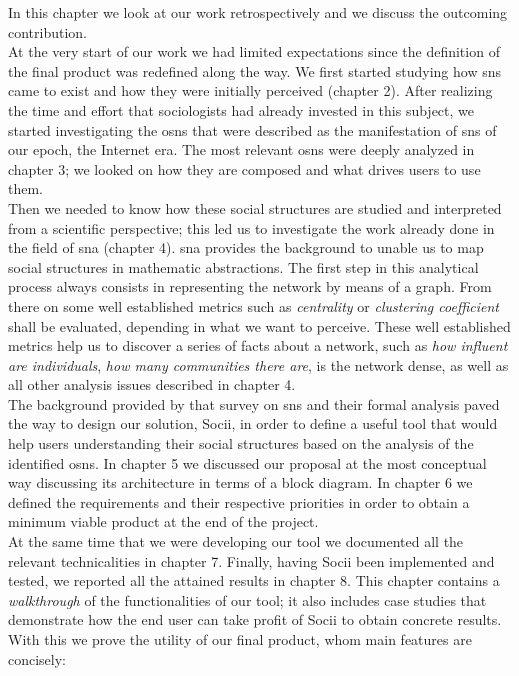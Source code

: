 In this chapter we look at our work retrospectively and we discuss the outcoming contribution.\\
\indent At the very start of our work we had limited expectations since the definition of the final product was redefined along the way. We first started studying how \glspl{sn} came to exist and how they were initially perceived (chapter 2). After realizing the time and effort that sociologists had already invested in this subject, we started investigating the \glspl{osn} that were described as the manifestation of \glspl{sn} of our epoch, the Internet era. The most relevant \glspl{osn} were deeply analyzed in chapter 3; we looked on how they are composed and what drives users to use them.\\
\indent Then we needed to know how these social structures are studied and interpreted from a scientific perspective; this led us to investigate the work already done in the field of \gls{sna} (chapter 4). \gls{sna} provides the background to unable us to map social structures in mathematic abstractions. The first step in this analytical process always consists in representing the network by means of a graph. From there on some well established metrics such as \emph{centrality} or \emph{clustering coefficient} shall be evaluated, depending in what we want to perceive. These well established metrics help us to discover a series of facts about a network, such as \emph{how influent are individuals}, \emph{how many communities there are}, is the network dense, as well as all other analysis issues described in chapter 4.\\
\indent The background provided by that survey on \glspl{sn} and their formal analysis paved the way to design our solution, Socii, in order to define a useful tool that would help users understanding their social structures based on the analysis of the identified \glspl{osn}. In chapter 5 we discussed our proposal at the most conceptual way discussing its architecture in terms of a block diagram. In chapter 6 we defined the requirements and their respective priorities in order to obtain a minimum viable product at the end of the project.\\
\indent At the same time that we were developing our tool we documented all the relevant technicalities in chapter 7. Finally, having Socii been implemented and tested, we reported all the attained results in chapter 8. This chapter contains a \textit{walkthrough} of the functionalities of our tool; it also includes case studies that demonstrate how the end user can take profit of Socii to obtain concrete results. With this we prove the utility of our final product, whom main features are concisely:
